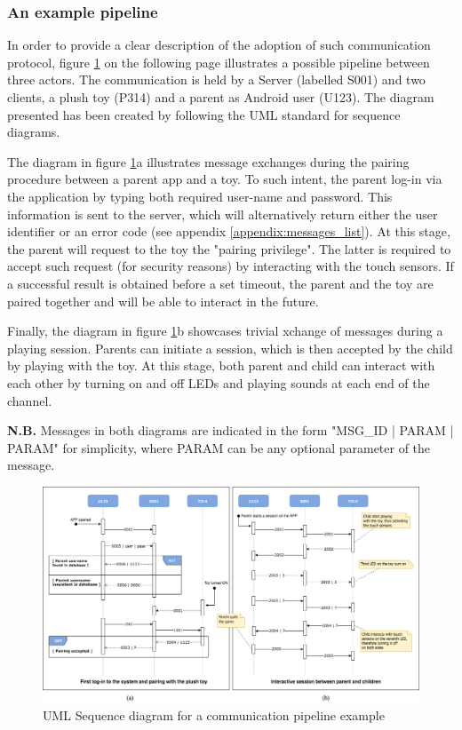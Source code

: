 \subsubsection{An example pipeline}
In order to provide a clear description of the adoption of such communication protocol, figure \ref{fig:SE_sequenceDiag} on the following page illustrates a possible pipeline between three actors. The communication is held by a Server (labelled S001) and two clients, a plush toy (P314) and a parent as Android user (U123). The diagram presented has been created by following the UML standard for sequence diagrams.

\medskip
The diagram in figure \ref{fig:SE_sequenceDiag}a illustrates message exchanges during the pairing procedure between a parent app and a toy. To such intent, the parent log-in via the application by typing both required user-name and password. This information is sent to the server, which will alternatively return either the user identifier or an error code (see appendix \ref{appendix:messages_list}). At this stage, the parent will request to the toy the "pairing privilege". The latter is required to accept such request (for security reasons) by interacting with the touch sensors. If a successful result is obtained before a set timeout, the parent and the toy are paired together and will be able to interact in the future.

\medskip
Finally, the diagram in figure \ref{fig:SE_sequenceDiag}b showcases trivial xchange of messages during a playing session. Parents can initiate a session, which is then accepted by the child by playing with the toy. At this stage, both parent and child can interact with each other by turning on and off LEDs and playing sounds at each end of the channel.

\bigskip
\noindent
\textbf{N.B.} Messages in both diagrams are indicated in the form "MSG\_ID | PARAM | PARAM" for simplicity, where PARAM can be any optional parameter of the message.

\begin{figure}
    \includegraphics[scale=0.58]{images/SE_communication_sequence.png}
    \caption{UML Sequence diagram for a communication pipeline example}
    \label{fig:SE_sequenceDiag}
\end{figure}